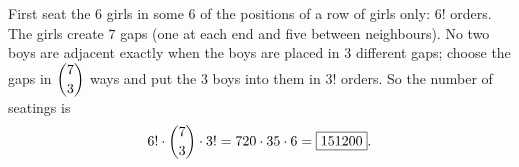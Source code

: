 First seat the $6$ girls in some $6$ of the positions of a row of girls only: $6!$ orders. The girls create $7$ gaps (one at each end and five between neighbours). No two boys are adjacent exactly when the boys are placed in $3$ different gaps; choose the gaps in $\dbinom73$ ways and put the $3$ boys into them in $3!$ orders. So the number of seatings is
\[
6!\cdot\dbinom73\cdot3!=720\cdot35\cdot6=\boxed{151200}.
\]
